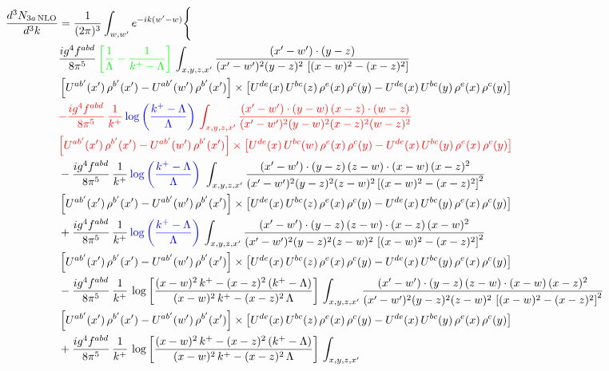 \documentclass[9pt]{article}
\numberwithin{equation}{section}
\begin{document}
\begin{align}
\frac{d^{3}N_{3a\,\rm NLO}}{d^{3}k} & =\frac{1}{(2\pi)^{3}}\int_{w,w'}e^{-ik(w'-w)}\Bigg\{\notag \\ & \frac{ig^{4}f^{abd}}{8\pi^{5}}\,{\color{green}\left[\frac{1}{\Lambda}-\frac{1}{k^{+}-\Lambda}\right]}\,\int_{x,y,z,x'}
\frac{(x'-w')\cdot(y-z)}{(x'-w')^{2}(y-z)^{2}\,\left[(x-w)^{2}-(x-z)^{2}\right]}\notag \\ & \left[U^{ab'}(x')\,\rho^{b'}(x')-U^{ab'}(w')\, \rho^{b'}(x')\right]\times \left[U^{de}(x)\,U^{bc}(z)\, \rho^{e}(x)\,\rho^{c}(y)-U^{de}(x)\,U^{bc}(y)\,\rho^{e}(x)\,\rho^{c}(y)\right]\notag \\ & {\color{red}-\frac{ig^{4}f^{abd}}{8\pi^{5}}\,\frac{1}{k^{+}}\,{\color{blue}\log{\left(\frac{k^{+}-\Lambda}{\Lambda}\right)}}\,\int_{x,y,z,x'}
\frac{(x'-w')\cdot(y-w)\,(x-z)\cdot(w-z)}{(x'-w')^{2}(y-w)^{2}(x-z)^{2}(w-z)^{2}}}\notag \\ & {\color{red}\left[U^{ab'}(x')\,\rho^{b'}(x')-U^{ab'}(w')\, \rho^{b'}(x')\right]\times \left[U^{de}(x)\,U^{bc}(w)\, \rho^{e}(x)\,\rho^{c}(y)-U^{de}(x)\,U^{bc}(y)\,\rho^{e}(x)\,\rho^{c}(y)\right]}\notag \\ & -\frac{ig^{4}f^{abd}}{8\pi^{5}}\,\frac{1}{k^{+}}\,{\color{blue}\log{\left(\frac{k^{+}-\Lambda}{\Lambda}\right)}}\,\,\int_{x,y,z,x'}
\frac{(x'-w')\cdot(y-z)\,(z-w)\cdot(x-w)\,(x-z)^{2}}{(x'-w')^{2}(y-z)^{2}(z-w)^{2}\left[(x-w)^{2}-(x-z)^{2}\right]^{2}}\notag \\ & \left[U^{ab'}(x')\,\rho^{b'}(x')-U^{ab'}(w')\, \rho^{b'}(x')\right]\times \left[U^{de}(x)\,U^{bc}(z)\, \rho^{e}(x)\,\rho^{c}(y)-U^{de}(x)\,U^{bc}(y)\,\rho^{e}(x)\,\rho^{c}(y)\right]\notag \\ & +\frac{ig^{4}f^{abd}}{8\pi^{5}}\,\frac{1}{k^{+}}\,{\color{blue}\log{\left(\frac{k^{+}-\Lambda}{\Lambda}\right)}}\,\int_{x,y,z,x'}
\frac{(x'-w')\cdot(y-z)\,(z-w)\cdot(x-z)\,(x-w)^{2}}{(x'-w')^{2}(y-z)^{2}(z-w)^{2}\,\left[(x-w)^{2}-(x-z)^{2}\right]^{2}}\notag \\ & \left[U^{ab'}(x')\,\rho^{b'}(x')-U^{ab'}(w')\, \rho^{b'}(x')\right]\times \left[U^{de}(x)\,U^{bc}(z)\, \rho^{e}(x)\,\rho^{c}(y)-U^{de}(x)\,U^{bc}(y)\,\rho^{e}(x)\,\rho^{c}(y)\right]\notag \\ & 
-\frac{ig^{4}f^{abd}}{8\pi^{5}}\,\frac{1}{k^{+}}\,\log{\left[\frac{(x-w)^{2}\,k^{+}-(x-z)^{2}\,(k^{+}-\Lambda)}{(x-w)^{2}\,k^{+}-(x-z)^{2}\,\Lambda}\right]}\,\int_{x,y,z,x'}
\frac{(x'-w')\cdot(y-z)\,(z-w)\cdot(x-w)\,(x-z)^{2}}{(x'-w')^{2}(y-z)^{2}(z-w)^{2}\,\left[(x-w)^{2}-(x-z)^{2}\right]^{2}}\notag \\ & \left[U^{ab'}(x')\,\rho^{b'}(x')-U^{ab'}(w')\, \rho^{b'}(x')\right]\times \left[U^{de}(x)\,U^{bc}(z)\, \rho^{e}(x)\,\rho^{c}(y)-U^{de}(x)\,U^{bc}(y)\,\rho^{e}(x)\,\rho^{c}(y)\right]\notag \\ & +\frac{ig^{4}f^{abd}}{8\pi^{5}}\,\frac{1}{k^{+}}\,\log{\left[\frac{(x-w)^{2}\,k^{+}-(x-z)^{2}\,(k^{+}-\Lambda)}{(x-w)^{2}\,k^{+}-(x-z)^{2}\,\Lambda}\right]}\,\int_{x,y,z,x'}

\end{align}
\end{document}

